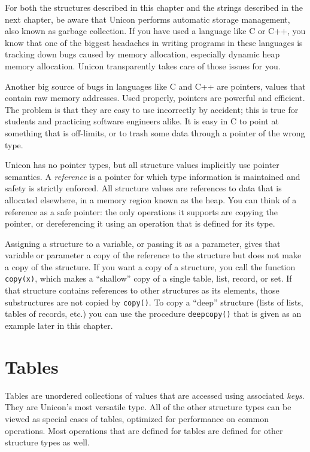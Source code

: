 For both the structures described in this chapter and the strings
described in the next chapter, be aware that Unicon performs
automatic storage management, also
known as garbage collection. If you have used
a language like C or C++, you know that one of the biggest headaches in
writing programs in these languages is tracking down bugs caused by
memory allocation, especially dynamic heap
memory allocation. Unicon transparently takes care of those issues for
you.

Another big source of bugs in languages like C and C++ are
pointers, values that contain raw memory addresses. Used properly, pointers are powerful and
efficient. The problem is that they are easy to use incorrectly by
accident; this is true for students and practicing software engineers
alike. It is easy in C to point at something that is off-limits, or to
trash some data through a pointer of the wrong type.

Unicon has no pointer types, but all structure values implicitly
use pointer semantics. A \textit{reference} is a
pointer for which type information is maintained and safety is
strictly enforced. All structure values are references to
data that is allocated elsewhere, in a memory region known as
the heap. You can think of a reference as a safe
pointer: the only operations it supports are copying the pointer, or
dereferencing it using an operation that is defined for its type.

Assigning a structure to a variable, or passing it as a
parameter, gives that variable or parameter a copy of
the reference to the structure but does not make a copy of the
structure. If you want a copy of a structure, you call the function
\texttt{copy(x)}, which makes a ``shallow''
copy of a single table, list, record, or set. If that structure
contains references to other structures as its elements, those
substructures are not copied by \texttt{copy()}. To copy a
``deep'' structure (lists of lists, tables of
records, etc.) you can use the procedure \texttt{deepcopy()} that is
given as an example later in this chapter.

\section{Tables}

Tables are unordered collections of values that
are accessed using associated \textit{keys}. They are Unicon's most versatile
type. All of the other structure types can be viewed as special cases
of tables, optimized for performance on common operations. Most
operations that are defined for tables are defined for other structure
types as well.

